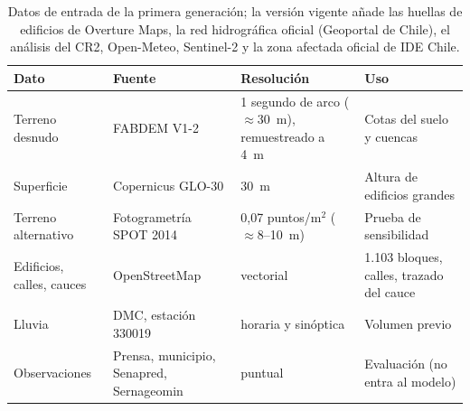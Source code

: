 \begin{table}[htbp]\centering\small
\caption{Datos de entrada de la primera generación; la versión vigente añade las huellas de edificios de Overture Maps, la red hidrográfica oficial (Geoportal de Chile), el análisis del CR2, Open-Meteo, Sentinel-2 y la zona afectada oficial de IDE Chile.}\label{tab:datos}
\begin{tabular}{p{}p{}p{}p{}}\toprule
Dato & Fuente & Resolución & Uso\\\midrule
Terreno desnudo & FABDEM V1-2 \citep{fabdem2023} & 1 segundo de arco ($\approx$\SI{30}{m}), remuestreado a \SI{4}{m} & Cotas del suelo y cuencas\\
Superficie & Copernicus GLO-30 \citep{copernicus_glo30} & \SI{30}{m} & Altura de edificios grandes\\
Terreno alternativo & Fotogrametría SPOT 2014 \citep{hussain2021} & 0,07 puntos/m$^2$ ($\approx$\SI{8}{}--\SI{10}{m}) & Prueba de sensibilidad\\
Edificios, calles, cauces & OpenStreetMap \citep{osm2026} & vectorial & 1.103 bloques, calles, trazado del cauce\\
Lluvia & DMC, estación 330019 \citep{dmc2026} & horaria y sinóptica & Volumen previo\\
Observaciones & Prensa, municipio, Senapred, Sernageomin & puntual & Evaluación (no entra al modelo)\\
\bottomrule\end{tabular}\end{table}
